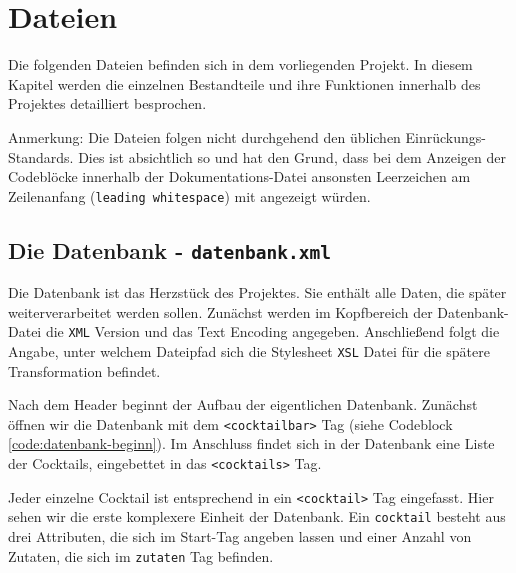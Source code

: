 \chapter{Dateien}
\label{chap:dateien}
\pagestyle{plain}

Die folgenden Dateien befinden sich in dem vorliegenden Projekt. In diesem Kapitel werden die einzelnen Bestandteile und ihre Funktionen innerhalb des Projektes detailliert besprochen.

Anmerkung: Die Dateien folgen nicht durchgehend den üblichen Einrückungs-Standards. Dies ist absichtlich so und hat den Grund, dass bei dem Anzeigen der Codeblöcke innerhalb der Dokumentations-Datei ansonsten Leerzeichen am Zeilenanfang (\texttt{leading whitespace}) mit angezeigt würden.

\setlength{\DTbaselineskip}{20pt}

\newpage
\section{Die Datenbank - \texttt{datenbank.xml}}\label{section:datenbank}

Die Datenbank ist das Herzstück des Projektes. Sie enthält alle Daten, die später weiterverarbeitet werden sollen. Zunächst werden im Kopfbereich der Datenbank-Datei die \texttt{XML} Version und das Text Encoding angegeben. Anschließend folgt die Angabe, unter welchem Dateipfad sich die Stylesheet \texttt{XSL} Datei für die spätere Transformation befindet.







Nach dem Header beginnt der Aufbau der eigentlichen Datenbank. Zunächst öffnen wir die Datenbank mit dem \texttt{<cocktailbar>} Tag (siehe Codeblock \ref{code:datenbank-beginn}). Im Anschluss findet sich in der Datenbank eine Liste der Cocktails, eingebettet in das \texttt{<cocktails>} Tag.

Jeder einzelne Cocktail ist entsprechend in ein \texttt{<cocktail>} Tag eingefasst. Hier sehen wir die erste komplexere Einheit der Datenbank. Ein \texttt{cocktail} besteht aus drei Attributen, die sich im Start-Tag angeben lassen und einer Anzahl von Zutaten, die sich im \texttt{zutaten} Tag befinden. 

